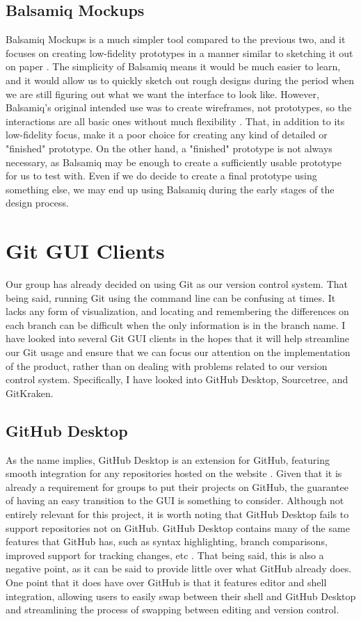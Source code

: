 \documentclass[10pt, letterpaper,draftclsnofoot,onecolumn, compsoc]{IEEEtran}
\begin{document}
\subsection{Balsamiq Mockups}
Balsamiq Mockups is a much simpler tool compared to the previous two, and it focuses on creating low-fidelity prototypes in a manner similar to sketching it out on paper \cite{balsamiq}. The simplicity of Balsamiq means it would be much easier to learn, and it would allow us to quickly sketch out rough designs during the period when we are still figuring out what we want the interface to look like. However, Balsamiq's original intended use was to create wireframes, not prototypes, so the interactions are all basic ones without much flexibility \cite{5best}. That, in addition to its low-fidelity focus, make it a poor choice for creating any kind of detailed or "finished" prototype. On the other hand, a "finished" prototype is not always necessary, as Balsamiq may be enough to create a sufficiently usable prototype for us to test with. Even if we do decide to create a final prototype using something else, we may end up using Balsamiq during the early stages of the design process.

\section{Git GUI Clients}
Our group has already decided on using Git as our version control system. That being said, running Git using the command line can be confusing at times. It lacks any form of visualization, and locating and remembering the differences on each branch can be difficult when the only information is in the branch name. I have looked into several Git GUI clients in the hopes that it will help streamline our Git usage and ensure that we can focus our attention on the implementation of the product, rather than on dealing with problems related to our version control system. Specifically, I have looked into GitHub Desktop, Sourcetree, and GitKraken.

\subsection{GitHub Desktop}
As the name implies, GitHub Desktop is an extension for GitHub, featuring smooth integration for any repositories hosted on the website \cite{gitgui}. Given that it is already a requirement for groups to put their projects on GitHub, the guarantee of having an easy transition to the GUI is something to consider. Although not entirely relevant for this project, it is worth noting that GitHub Desktop fails to support repositories not on GitHub. GitHub Desktop contains many of the same features that GitHub has, such as syntax highlighting, branch comparisons, improved support for tracking changes, etc \cite{githubdesk}. That being said, this is also a negative point, as it can be said to provide little over what GitHub already does. One point that it does have over GitHub is that it features editor and shell integration, allowing users to easily swap between their shell and GitHub Desktop and streamlining the process of swapping between editing and version control.
\end{document}
